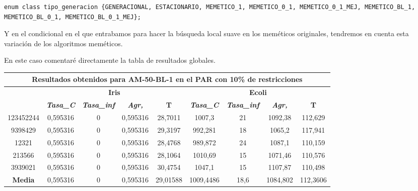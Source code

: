 \documentclass[12pt, spanish]{article}
\begin{document}
\begin{lstlisting}
enum class tipo_generacion {GENERACIONAL, ESTACIONARIO, MEMETICO_1, MEMETICO_0_1, MEMETICO_0_1_MEJ, MEMETICO_BL_1, MEMETICO_BL_0_1, MEMETICO_BL_0_1_MEJ};
\end{lstlisting}

Y en el condicional en el que entrabamos para hacer la búsqueda local suave en los meméticos originales, tendremos en cuenta esta variación de los algoritmos meméticos.

En este caso comentaré directamente la tabla de resultados globales.

\begin{table}[H]
\footnotesize
\begin{tabular}{|c|c|c|c|c|c|c|c|c|}
\hline
\multicolumn{9}{|c|}{\textbf{Resultados obtenidos para AM-50-BL-1 en el PAR con 10\% de restricciones}}                                                                                                           \\ \hline
\multirow{2}{*}{} & \multicolumn{4}{c|}{\textbf{Iris}}                                                            & \multicolumn{4}{c|}{\textbf{Ecoli}}                                                           \\ \cline{2-9} 
                  & \textit{\textbf{Tasa\_C}} & \textit{\textbf{Tasa\_inf}} & \textit{\textbf{Agr,}} & \textbf{T} & \textit{\textbf{Tasa\_C}} & \textit{\textbf{Tasa\_inf}} & \textit{\textbf{Agr,}} & \textbf{T} \\ \hline
123452244         & 0,595316                  & 0                           & 0,595316               & 28,7011    & 1007,3                    & 21                          & 1092,38                & 112,629    \\ \hline
9398429           & 0,595316                  & 0                           & 0,595316               & 29,3197    & 992,281                   & 18                          & 1065,2                 & 117,941    \\ \hline
12321             & 0,595316                  & 0                           & 0,595316               & 28,4768    & 989,872                   & 24                          & 1087,1                 & 110,159    \\ \hline
213566            & 0,595316                  & 0                           & 0,595316               & 28,1064    & 1010,69                   & 15                          & 1071,46                & 110,576    \\ \hline
3939021           & 0,595316                  & 0                           & 0,595316               & 30,4754    & 1047,1                    & 15                          & 1107,87                & 110,498    \\ \hline
\textbf{Media}    & 0,595316                  & 0                           & 0,595316               & 29,01588   & 1009,4486                 & 18,6                        & 1084,802               & 112,3606   \\ \hline
\end{tabular}
\end{table}
\end{document}
